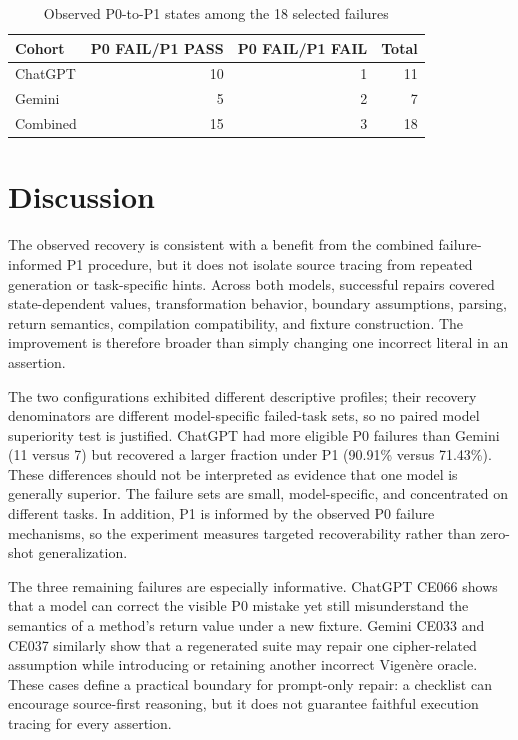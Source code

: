 \documentclass[conference]{IEEEtran}
\begin{document}
\begin{table}[t]
\caption{Observed P0-to-P1 states among the 18 selected failures}
\centering\scriptsize
\begin{tabular}{@{}lrrr@{}}\toprule
Cohort & P0 FAIL/P1 PASS & P0 FAIL/P1 FAIL & Total \\ \midrule
ChatGPT & 10 & 1 & 11 \\
Gemini & 5 & 2 & 7 \\
Combined & 15 & 3 & 18 \\ \bottomrule
\end{tabular}
\end{table}

\section{Discussion}
The observed recovery is consistent with a benefit from the combined failure-informed P1 procedure, but it does not isolate source tracing from repeated generation or task-specific hints. Across both models, successful repairs covered state-dependent values, transformation behavior, boundary assumptions, parsing, return semantics, compilation compatibility, and fixture construction. The improvement is therefore broader than simply changing one incorrect literal in an assertion.

The two configurations exhibited different descriptive profiles; their recovery denominators are different model-specific failed-task sets, so no paired model superiority test is justified. ChatGPT had more eligible P0 failures than Gemini (11 versus 7) but recovered a larger fraction under P1 (90.91\% versus 71.43\%). These differences should not be interpreted as evidence that one model is generally superior. The failure sets are small, model-specific, and concentrated on different tasks. In addition, P1 is informed by the observed P0 failure mechanisms, so the experiment measures targeted recoverability rather than zero-shot generalization.

The three remaining failures are especially informative. ChatGPT CE066 shows that a model can correct the visible P0 mistake yet still misunderstand the semantics of a method's return value under a new fixture. Gemini CE033 and CE037 similarly show that a regenerated suite may repair one cipher-related assumption while introducing or retaining another incorrect Vigen\`ere oracle. These cases define a practical boundary for prompt-only repair: a checklist can encourage source-first reasoning, but it does not guarantee faithful execution tracing for every assertion.
\end{document}
